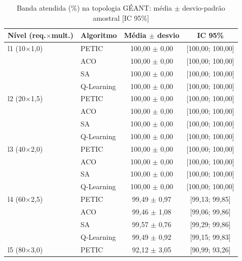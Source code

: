 \begin{table}[htb]
    \centering
    \small
    \caption{Banda atendida (\%) na topologia GÉANT: média $\pm$ desvio-padrão amostral [IC 95\%]}
    \label{tab:banda-geant}
    \begin{tabular}{llcc}
        \hline
        Nível (req.$\times$mult.) & Algoritmo & Média $\pm$ desvio & IC 95\% \\
        \hline
        l1 (10$\times$1,0) & PETIC & 100,00 $\pm$ 0,00 & [100,00; 100,00] \\
         & ACO & 100,00 $\pm$ 0,00 & [100,00; 100,00] \\
         & SA & 100,00 $\pm$ 0,00 & [100,00; 100,00] \\
         & Q-Learning & 100,00 $\pm$ 0,00 & [100,00; 100,00] \\
        \hline
        l2 (20$\times$1,5) & PETIC & 100,00 $\pm$ 0,00 & [100,00; 100,00] \\
         & ACO & 100,00 $\pm$ 0,00 & [100,00; 100,00] \\
         & SA & 100,00 $\pm$ 0,00 & [100,00; 100,00] \\
         & Q-Learning & 100,00 $\pm$ 0,00 & [100,00; 100,00] \\
        \hline
        l3 (40$\times$2,0) & PETIC & 100,00 $\pm$ 0,00 & [100,00; 100,00] \\
         & ACO & 100,00 $\pm$ 0,00 & [100,00; 100,00] \\
         & SA & 100,00 $\pm$ 0,00 & [100,00; 100,00] \\
         & Q-Learning & 100,00 $\pm$ 0,00 & [100,00; 100,00] \\
        \hline
        l4 (60$\times$2,5) & PETIC & 99,49 $\pm$ 0,97 & [99,13; 99,85] \\
         & ACO & 99,46 $\pm$ 1,08 & [99,06; 99,86] \\
         & SA & 99,57 $\pm$ 0,76 & [99,29; 99,86] \\
         & Q-Learning & 99,49 $\pm$ 0,92 & [99,15; 99,83] \\
        \hline
        l5 (80$\times$3,0) & PETIC & 92,12 $\pm$ 3,05 & [90,99; 93,26] \\

\end{tabular}
\end{table}
